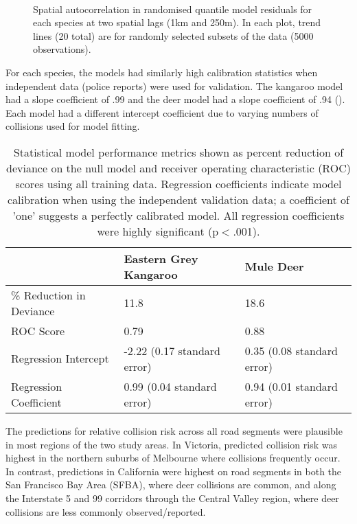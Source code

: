 \begin{figure*}[htp]
  \captionsetup[subfloat]{farskip=-2pt,nearskip=-2pt}
  \centering
  \\
  \caption[]{Spatial autocorrelation in randomised quantile model residuals for each species at two spatial lags (1km and 250m).  In each plot, trend lines (20 total) are for randomly selected subsets of the data (5000 observations).}
  \label{cal_sac}
\end{figure*}

For each species, the models had similarly high calibration statistics when independent data (police reports) were used for validation. The kangaroo model had a slope coefficient of .99 and the deer model had a slope coefficient of .94 (). Each model had a different intercept coefficient due to varying numbers of collisions used for model fitting.

\begin{table}[htp]
\caption{Statistical model performance metrics shown as percent reduction of deviance on the null model and receiver operating characteristic (ROC) scores using all training data. Regression coefficients indicate model calibration when using the independent validation data; a coefficient of 'one' suggests a perfectly calibrated model.  All regression coefficients were highly significant (p$<$.001).}
\begin{tabularx}{\textwidth}{lll} \toprule
                        	&Eastern Grey Kangaroo			&Mule Deer \\ \midrule 
\% Reduction in Deviance 	& 11.8							& 18.6  \\ 
ROC Score 					& 0.79							& 0.88	\\ 
Regression Intercept 		& -2.22 (0.17 standard error)	& 0.35 (0.08 standard error) \\ 
Regression Coefficient 		& 0.99 (0.04 standard error)	& 0.94 (0.01 standard error) \\ 
\bottomrule
\end{tabularx}
\label{cal_model_perf}
\end{table}

The predictions for relative collision risk across all road segments were plausible in most regions of the two study areas.  In Victoria, predicted collision risk was highest in the northern suburbs of Melbourne where collisions frequently occur. In contrast, predictions in California were highest on road segments in both the San Francisco Bay Area (SFBA), where deer collisions are common, and along the Interstate 5 and 99 corridors through the Central Valley region, where deer collisions are less commonly observed/reported.

